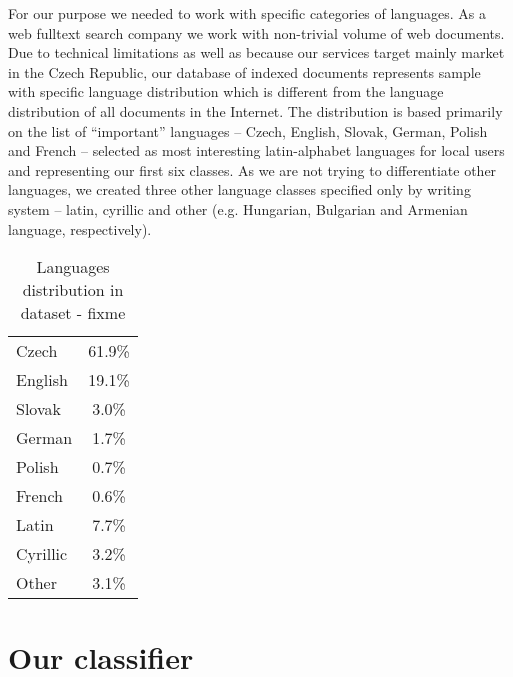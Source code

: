 \documentclass{acm_proc_article-sp}
\begin{document}
  For our purpose we needed to work with specific categories of languages.
  As a web fulltext search company we work with non-trivial volume of web documents.
  Due to technical limitations as well as because our services target mainly market in the Czech Republic,
  our database of indexed documents represents sample with specific language distribution which is different from the
  language distribution of all documents in the Internet.
  The distribution is based primarily on the list of “important” languages –
  Czech, English, Slovak, German, Polish and French –
  selected as most interesting latin-alphabet languages for local users and representing  our first six classes.
  As we are not trying to differentiate other languages, we created three other language classes specified only by writing system
  – latin, cyrillic and other (e.g. Hungarian, Bulgarian and Armenian language, respectively).

  \begin{table}[]
 \centering
 \caption{Languages distribution in dataset - fixme} 
 \label{langdist} 
 \vspace{0.5cm}
 \begin{tabular}{l||c}
    Czech & 61.9\% \\
    English & 19.1\% \\
    Slovak & 3.0\% \\
    German & 1.7\% \\
    Polish & 0.7\% \\
    French & 0.6\% \\ \hline
    Latin & 7.7\% \\
    Cyrillic & 3.2\% \\
    Other & 3.1\% \\
 \end{tabular}
 \end{table}


  \section{Our classifier}
\end{document}
